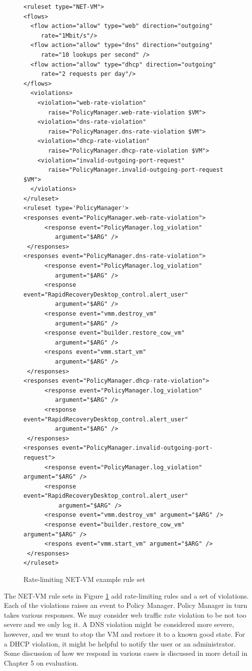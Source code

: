 \begin{figure}[tbp]
\caption{Rate-limiting NET-VM example rule set}
\label{lst:net_vm-rate}

\begin{lstlisting}
<ruleset type="NET-VM">
<flows>
  <flow action="allow" type="web" direction="outgoing" 
     rate="1Mbit/s"/>
  <flow action="allow" type="dns" direction="outgoing" 
     rate="10 lookups per second" />
  <flow action="allow" type="dhcp" direction="outgoing" 
     rate="2 requests per day"/>
</flows>
  <violations>
    <violation="web-rate-violation" 
       raise="PolicyManager.web-rate-violation $VM">
    <violation="dns-rate-violation" 
       raise="PolicyManager.dns-rate-violation $VM">
    <violation="dhcp-rate-violation" 
       raise="PolicyManager.dhcp-rate-violation $VM">
    <violation="invalid-outgoing-port-request" 
       raise="PolicyManager.invalid-outgoing-port-request $VM">
  </violations>
</ruleset>
<ruleset type='PolicyManager'>
<responses event="PolicyManager.web-rate-violation">
      <response event="PolicyManager.log_violation" 
         argument="$ARG" />
 </responses>
<responses event="PolicyManager.dns-rate-violation">
      <response event="PolicyManager.log_violation" 
         argument="$ARG" />
      <response event="RapidRecoveryDesktop_control.alert_user" 
         argument="$ARG" />      
      <response event="vmm.destroy_vm" 
         argument="$ARG" />
      <response event="builder.restore_cow_vm" 
         argument="$ARG" />
      <respons event="vmm.start_vm" 
         argument="$ARG" />
 </responses>
<responses event="PolicyManager.dhcp-rate-violation">
      <response event="PolicyManager.log_violation" 
         argument="$ARG" />
      <response event="RapidRecoveryDesktop_control.alert_user" 
         argument="$ARG" />      
 </responses>
<responses event="PolicyManager.invalid-outgoing-port-request">
      <response event="PolicyManager.log_violation" argument="$ARG" />
      <response event="RapidRecoveryDesktop_control.alert_user" 
          argument="$ARG" />      
      <response event="vmm.destroy_vm" argument="$ARG" />
      <response event="builder.restore_cow_vm" argument="$ARG" />
      <respons event="vmm.start_vm" argument="$ARG" />
 </responses>
</ruleset>
\end{lstlisting}
\end{figure}

The NET-VM rule sets in Figure \ref{lst:net_vm-rate} add rate-limiting rules and a set of violations. Each of the violations raises an event to Policy Manager. Policy Manager in turn takes various responses. We may consider web traffic rate violation to be not too severe and we only log it. A DNS violation might be considered more severe, however, and we want to stop the VM and restore it to a known good state. For a DHCP violation, it might be helpful to notify the user or an administrator. Some discussion of how we respond in various cases is discussed in more detail in Chapter 5 on evaluation. 

